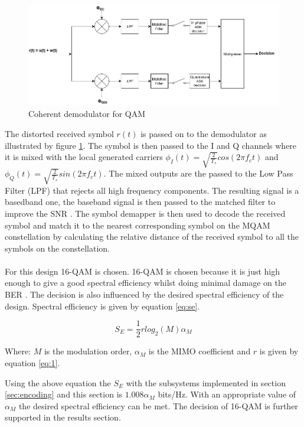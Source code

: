 \documentclass[11pt]{report}
\begin{document}
\begin{figure}[h!]
	\centering
	\includegraphics[width=\textwidth]{resources/demod.png}
	\caption{Coherent demodulator for QAM}
	\label{fig:demod}
\end{figure}
\vspace{12pt}
The distorted received symbol $r(t)$ is passed on to the demodulator as illustrated by figure \ref{fig:demod}. The symbol is then passed to the I and Q channels  where it is mixed with the local generated carriers $\phi_I(t) = \sqrt{\frac{2}{T_s}}cos(2\pi f_ct)$ and  $\phi_Q(t) = \sqrt{\frac{2}{T_s}}sin(2\pi f_ct)$. The mixed outputs are the passed to the Low Pass Filter (LPF) that rejects all high frequency components. The resulting signal is a basedband one, the baseband signal is then passed to the matched filter to improve the SNR \cite{B16}. The symbol demapper is then used to decode the received symbol and match it to the nearest corresponding symbol on the MQAM constellation by calculating the relative distance of the received symbol to all the symbols on the constellation. 
\\
\\
For this design 16-QAM is chosen. 16-QAM is chosen because it is just high enough to give a good spectral efficiency  whilst doing minimal damage on the BER \cite{B8}. The decision is also influenced by the desired spectral efficiency of the design. Spectral efficiency is given by equation \ref{eq:se}.

\begin{equation}
\label{eq:se}
S_E = \frac{1}{2}rlog_2(M)\alpha_M
\end{equation}
\begin{center}
	Where: $M$ is the modulation order, $\alpha_M$ is the MIMO coefficient and $r$ is given by equation \ref{eq:1}.
\end{center}

Using the above equation the $S_E$ with the subsystems implemented in section \ref{sec:encoding} and this section is $1.008\alpha_M$ bits/Hz. With an appropriate value of $\alpha_M$ the desired spectral efficiency can be met. The decision of 16-QAM is further supported in the results section.
\end{document}
